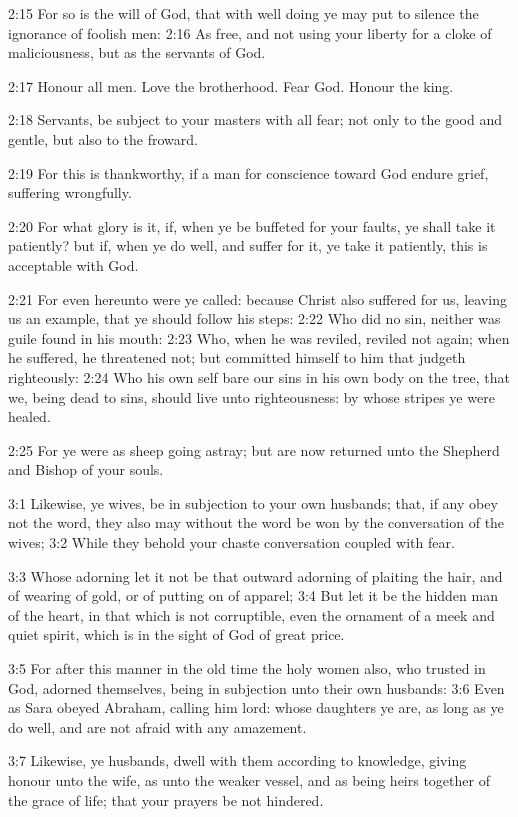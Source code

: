 2:15 For so is the will of God, that with well doing ye may put to
silence the ignorance of foolish men: 2:16 As free, and not using your
liberty for a cloke of maliciousness, but as the servants of God.

2:17 Honour all men. Love the brotherhood. Fear God. Honour the king.

2:18 Servants, be subject to your masters with all fear; not only to
the good and gentle, but also to the froward.

2:19 For this is thankworthy, if a man for conscience toward God
endure grief, suffering wrongfully.

2:20 For what glory is it, if, when ye be buffeted for your faults, ye
shall take it patiently? but if, when ye do well, and suffer for it,
ye take it patiently, this is acceptable with God.

2:21 For even hereunto were ye called: because Christ also suffered
for us, leaving us an example, that ye should follow his steps: 2:22
Who did no sin, neither was guile found in his mouth: 2:23 Who, when
he was reviled, reviled not again; when he suffered, he threatened
not; but committed himself to him that judgeth righteously: 2:24 Who
his own self bare our sins in his own body on the tree, that we, being
dead to sins, should live unto righteousness: by whose stripes ye were
healed.

2:25 For ye were as sheep going astray; but are now returned unto the
Shepherd and Bishop of your souls.

3:1 Likewise, ye wives, be in subjection to your own husbands; that,
if any obey not the word, they also may without the word be won by the
conversation of the wives; 3:2 While they behold your chaste
conversation coupled with fear.

3:3 Whose adorning let it not be that outward adorning of plaiting the
hair, and of wearing of gold, or of putting on of apparel; 3:4 But let
it be the hidden man of the heart, in that which is not corruptible,
even the ornament of a meek and quiet spirit, which is in the sight of
God of great price.

3:5 For after this manner in the old time the holy women also, who
trusted in God, adorned themselves, being in subjection unto their own
husbands: 3:6 Even as Sara obeyed Abraham, calling him lord: whose
daughters ye are, as long as ye do well, and are not afraid with any
amazement.

3:7 Likewise, ye husbands, dwell with them according to knowledge,
giving honour unto the wife, as unto the weaker vessel, and as being
heirs together of the grace of life; that your prayers be not
hindered.


